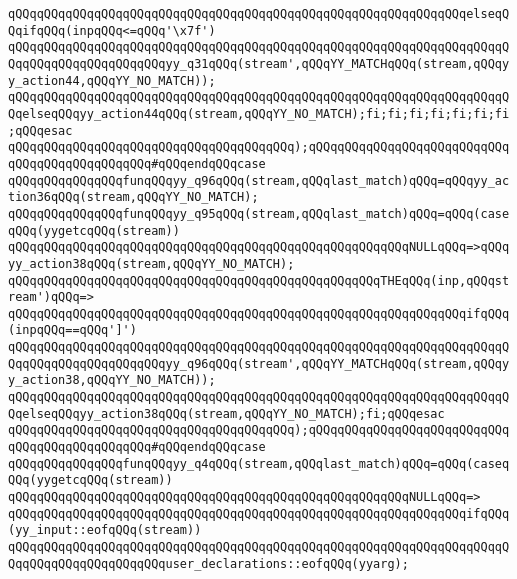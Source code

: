 \verb|qQQqqQQqqQQqqQQqqQQqqQQqqQQqqQQqqQQqqQQqqQQqqQQqqQQqqQQqqQQqqQQqelseqQQqifqQQq(inpqQQq<=qQQq'\x7f')|\newline
\verb|qQQqqQQqqQQqqQQqqQQqqQQqqQQqqQQqqQQqqQQqqQQqqQQqqQQqqQQqqQQqqQQqqQQqqQQqqQQqqQQqqQQqqQQqqQQqyy_q31qQQq(stream',qQQqYY_MATCHqQQq(stream,qQQqyy_action44,qQQqYY_NO_MATCH));|\newline
\verb|qQQqqQQqqQQqqQQqqQQqqQQqqQQqqQQqqQQqqQQqqQQqqQQqqQQqqQQqqQQqqQQqqQQqqQQqelseqQQqyy_action44qQQq(stream,qQQqYY_NO_MATCH);fi;fi;fi;fi;fi;fi;fi;qQQqesac|\newline
\verb|qQQqqQQqqQQqqQQqqQQqqQQqqQQqqQQqqQQqqQQq);qQQqqQQqqQQqqQQqqQQqqQQqqQQqqQQqqQQqqQQqqQQqqQQq#qQQqendqQQqcase|\newline
\verb|qQQqqQQqqQQqqQQqfunqQQqyy_q96qQQq(stream,qQQqlast_match)qQQq=qQQqyy_action36qQQq(stream,qQQqYY_NO_MATCH);|\newline
\verb|qQQqqQQqqQQqqQQqfunqQQqyy_q95qQQq(stream,qQQqlast_match)qQQq=qQQq(caseqQQq(yygetcqQQq(stream))|\newline
\verb|qQQqqQQqqQQqqQQqqQQqqQQqqQQqqQQqqQQqqQQqqQQqqQQqqQQqqQQqNULLqQQq=>qQQqyy_action38qQQq(stream,qQQqYY_NO_MATCH);|\newline
\verb|qQQqqQQqqQQqqQQqqQQqqQQqqQQqqQQqqQQqqQQqqQQqqQQqqQQqTHEqQQq(inp,qQQqstream')qQQq=>|\newline
\verb|qQQqqQQqqQQqqQQqqQQqqQQqqQQqqQQqqQQqqQQqqQQqqQQqqQQqqQQqqQQqqQQqifqQQq(inpqQQq==qQQq']')|\newline
\verb|qQQqqQQqqQQqqQQqqQQqqQQqqQQqqQQqqQQqqQQqqQQqqQQqqQQqqQQqqQQqqQQqqQQqqQQqqQQqqQQqqQQqqQQqqQQqyy_q96qQQq(stream',qQQqYY_MATCHqQQq(stream,qQQqyy_action38,qQQqYY_NO_MATCH));|\newline
\verb|qQQqqQQqqQQqqQQqqQQqqQQqqQQqqQQqqQQqqQQqqQQqqQQqqQQqqQQqqQQqqQQqqQQqqQQqelseqQQqyy_action38qQQq(stream,qQQqYY_NO_MATCH);fi;qQQqesac|\newline
\verb|qQQqqQQqqQQqqQQqqQQqqQQqqQQqqQQqqQQqqQQq);qQQqqQQqqQQqqQQqqQQqqQQqqQQqqQQqqQQqqQQqqQQqqQQq#qQQqendqQQqcase|\newline
\verb|qQQqqQQqqQQqqQQqfunqQQqyy_q4qQQq(stream,qQQqlast_match)qQQq=qQQq(caseqQQq(yygetcqQQq(stream))|\newline
\verb|qQQqqQQqqQQqqQQqqQQqqQQqqQQqqQQqqQQqqQQqqQQqqQQqqQQqqQQqNULLqQQq=>|\newline
\verb|qQQqqQQqqQQqqQQqqQQqqQQqqQQqqQQqqQQqqQQqqQQqqQQqqQQqqQQqqQQqqQQqifqQQq(yy_input::eofqQQq(stream))|\newline
\verb|qQQqqQQqqQQqqQQqqQQqqQQqqQQqqQQqqQQqqQQqqQQqqQQqqQQqqQQqqQQqqQQqqQQqqQQqqQQqqQQqqQQqqQQqqQQquser_declarations::eofqQQq(yyarg);|\newline
